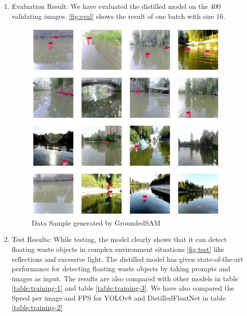 \begin{enumerate}
\item Evaluation Result: We have evaluated the distilled model on the 400 validating images. \ref{fig:eval} shows the result of one batch with size 16.\newline 
\begin{figure}[H]
\centering
	\includegraphics*[height=10cm, width = 10cm]{images/Data-Sample-generated-GroundedSAM.png}
	 \caption{Data Sample generated by GroundedSAM}
	\label{fig:Dataset}
\end{figure}


\item Test Results:
While testing, the model clearly shows that it can detect floating waste objects in complex environment situations \ref{fig:test} like reflections and excessive light. The distilled model has given state-of-the-art performance for detecting floating waste objects by taking prompts and images as input. The results are also compared with other models in table \ref{table:training-1} and table \ref{table:training-3}. We have also compared the Speed per image and FPS for YOLOv8 and DistilledFloatNet in table \ref{table:training-2}
   

\end{enumerate}

